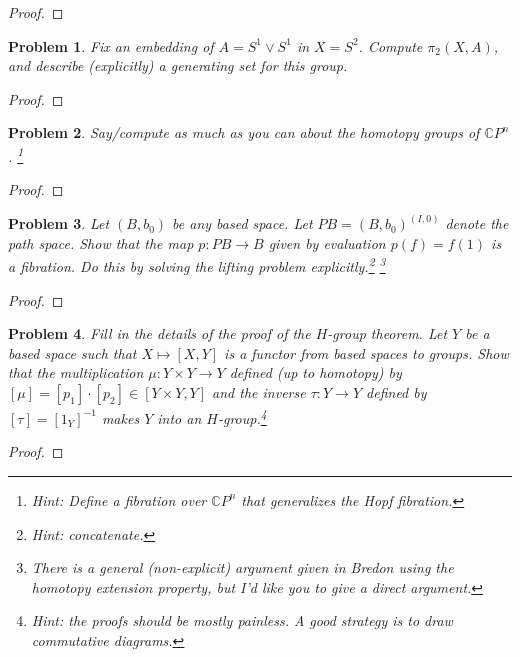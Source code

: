 \documentclass[11pt]{article}
\newtheorem{problem}{Problem}
\begin{document}
\begin{proof}

\end{proof}


\pagebreak 



\begin{problem}
Fix an embedding of $A=S^1\vee S^1$ in $X=S^2$. Compute $\pi_2(X,A)$, and describe (explicitly) a generating set for this group. 
\end{problem}

\begin{proof}

\end{proof}

\pagebreak 


\begin{problem}
Say/compute as much as you can about the homotopy groups of $\mathbb CP^n$.  \footnote{Hint: Define a fibration over $\mathbb CP^n$ that generalizes the Hopf fibration. } 
\end{problem}


\begin{proof}

\end{proof}

\pagebreak 


\begin{problem}
Let $(B,b_0)$ be any based space. Let $PB=(B,b_0)^{(I,0)}$ denote the path space. Show that the map $p:PB\rightarrow B$ given by evaluation $p(f)=f(1)$ is a fibration. Do this by solving the lifting problem explicitly.\footnote{Hint: concatenate.} \footnote{There is a general (non-explicit) argument given in Bredon using the homotopy extension property, but I'd like you to give a direct argument.}
\end{problem}

\begin{proof}

\end{proof}

\pagebreak 


\begin{problem}
Fill in the details of the proof of the $H$-group theorem. Let $Y$ be a based space such that $X\mapsto [X,Y]$ is a functor from based spaces to groups. Show that the multiplication $\mu:Y\times Y\to Y$ defined (up to homotopy) by $[\mu]=[p_1]\cdot[p_2]\in[Y\times Y,Y]$ and the inverse $\tau:Y\to Y$ defined by $[\tau]=[1_Y]^{-1}$ makes $Y$ into an $H$-group.\footnote{Hint: the proofs should be mostly painless. A good strategy is to draw commutative diagrams.}
\end{problem}

\begin{proof}

\end{proof}
\end{document}
